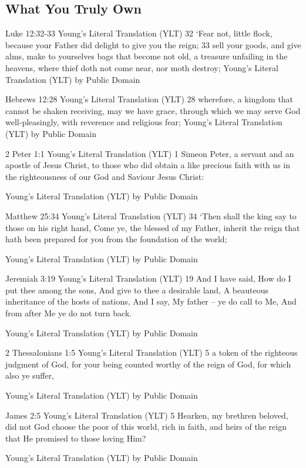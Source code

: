 \documentclass[11pt]{article}
\begin{document}
\subsection{What You Truly Own}\label{what you truly own}


Luke 12:32-33 Young's Literal Translation (YLT)
32 `Fear not, little flock, because your Father did delight to give you the reign;
33 sell your goods, and give alms, make to yourselves bags that become not old, a treasure unfailing in the heavens, where thief doth not come near, nor moth destroy;
Young's Literal Translation (YLT)
by Public Domain

Hebrews 12:28 Young's Literal Translation (YLT)
28 wherefore, a kingdom that cannot be shaken receiving, may we have grace, through which we may serve God well-pleasingly, with reverence and religious fear;
Young's Literal Translation (YLT)
by Public Domain

2 Peter 1:1 Young's Literal Translation (YLT)
1 Simeon Peter, a servant and an apostle of Jesus Christ, to those who did obtain a like precious faith with us in the righteousness of our God and Saviour Jesus Christ:

Young's Literal Translation (YLT)
by Public Domain

Matthew 25:34 Young's Literal Translation (YLT)
34 `Then shall the king say to those on his right hand, Come ye, the blessed of my Father, inherit the reign that hath been prepared for you from the foundation of the world;

Young's Literal Translation (YLT)
by Public Domain

Jeremiah 3:19 Young's Literal Translation (YLT)
19 And I have said, How do I put thee among the sons, And give to thee a desirable land, A beauteous inheritance of the hosts of nations, And I say, My father -- ye do call to Me, And from after Me ye do not turn back.

Young's Literal Translation (YLT)
by Public Domain

2 Thessalonians 1:5 Young's Literal Translation (YLT)
5 a token of the righteous judgment of God, for your being counted worthy of the reign of God, for which also ye suffer,

Young's Literal Translation (YLT)
by Public Domain

James 2:5 Young's Literal Translation (YLT)
5 Hearken, my brethren beloved, did not God choose the poor of this world, rich in faith, and heirs of the reign that He promised to those loving Him?

Young's Literal Translation (YLT)
by Public Domain
\end{document}
